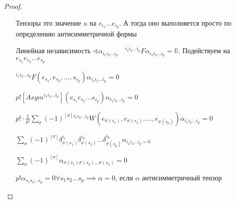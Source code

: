 \documentclass{book}
\theoremstyle{definition}
\begin{document}
\begin{proof}
\begin{itemize}
\begin{lemma}
                 Тензоры это значение $u$ на  $e_{i_1} \ldots e_{i_p}$. А тогда оно выполняется просто по определению антисимметричной формы
             \end{lemma}
         \item[Линейная независимость]
             $\sphericalangle \alpha_{i_1 i_2 \ldots i_p}\quad ^{i_1 i_2 \ldots i_p}F\alpha_{i_1 i_2 \ldots i_p} = \mathds{0}$. Подействуем на $e_{s_1} e_{s_2} \ldots e_{s_p}$

             $^{i_1 i_2 \ldots i_p}F\left( e_{s_1}, e_{s_2}, \ldots, s_{s_p}  \right) \alpha_{i_1 i_2  \ldots i_p} = 0$

             $p!\left[Asym^{i_1 i_2 \ldots i_p}\right]\left( e_{s_1} e_{s_2} \ldots s_{s_p} \right) \alpha_{i_1 i_2 \ldots i_p} = 0  $ 

             $p!\cdot \frac{1}{p!}\sum_{\sigma} (-1)^{[\sigma]}{}^{i_1 i_2 \ldots i_p}W\left( e_{\sigma(s_1)}, e_{\sigma(s_2)}, \ldots, e_{\sigma(s_p)} \right) \alpha_{i_1 i_2 \ldots i_p}  = 0$ 

                 $\sum_{\sigma} (-1)^{[\sigma]}\delta_{\sigma(s_1)}^{i_1}\delta_{\sigma(s_2)}^{i_2} \ldots \delta_{\sigma(s_p)}^{i_p} \alpha_{i_1 i_2 \ldots i_p = 0}$ 

                 $\sum_{\sigma}(-1)^{[\sigma]}\alpha_{\sigma(s_1)\sigma(s_2) \ldots \sigma(s_2)} = 0$

                 $p!\alpha_{s_1 s_2 \ldots s_p} = 0 \forall  s_1 s_2 \ldots s_p \implies  \alpha = 0$, если $\alpha$ антисимметричный тензор

     \end{itemize}
 \end{proof}
\end{document}
